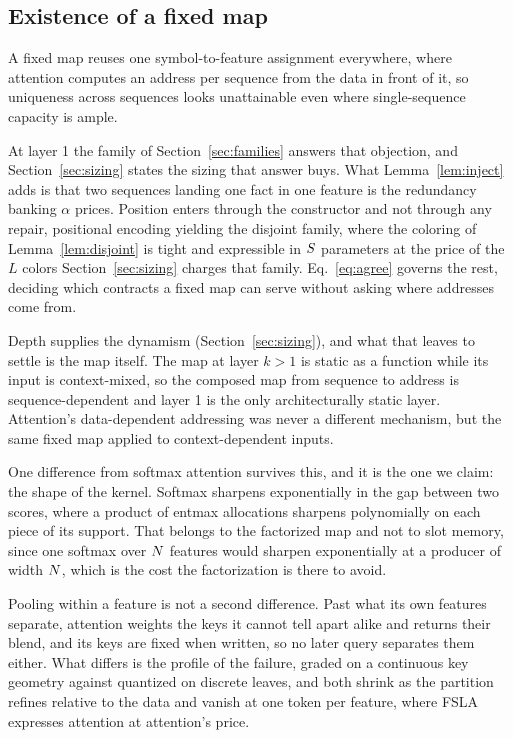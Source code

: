\subsection{Existence of a fixed map}
\label{sec:router}

A fixed map reuses one symbol-to-feature assignment everywhere, where attention computes an address per sequence from the data in front of it, so uniqueness across sequences looks unattainable even where single-sequence capacity is ample.

At layer 1 the family of Section~\ref{sec:families} answers that objection, and Section~\ref{sec:sizing} states the sizing that answer buys. What Lemma~\ref{lem:inject} adds is that two sequences landing one fact in one feature is the redundancy banking $\alpha$ prices. Position enters through the constructor and not through any repair, positional encoding yielding the disjoint family, where the coloring of Lemma~\ref{lem:disjoint} is tight and expressible in $S$ parameters at the price of the $L$ colors Section~\ref{sec:sizing} charges that family. Eq.~\eqref{eq:agree} governs the rest, deciding which contracts a fixed map can serve without asking where addresses come from.

Depth supplies the dynamism (Section~\ref{sec:sizing}), and what that leaves to settle is the map itself. The map at layer $k > 1$ is static as a function while its input is context-mixed, so the composed map from sequence to address is sequence-dependent and layer 1 is the only architecturally static layer. Attention's data-dependent addressing was never a different mechanism, but the same fixed map applied to context-dependent inputs.

One difference from softmax attention survives this, and it is the one we claim: the shape of the kernel. Softmax sharpens exponentially in the gap between two scores, where a product of entmax allocations sharpens polynomially on each piece of its support. That belongs to the factorized map and not to slot memory, since one softmax over $N$ features would sharpen exponentially at a producer of width $N$, which is the cost the factorization is there to avoid.

Pooling within a feature is not a second difference. Past what its own features separate, attention weights the keys it cannot tell apart alike and returns their blend, and its keys are fixed when written, so no later query separates them either. What differs is the profile of the failure, graded on a continuous key geometry against quantized on discrete leaves, and both shrink as the partition refines relative to the data and vanish at one token per feature, where FSLA expresses attention at attention's price.

